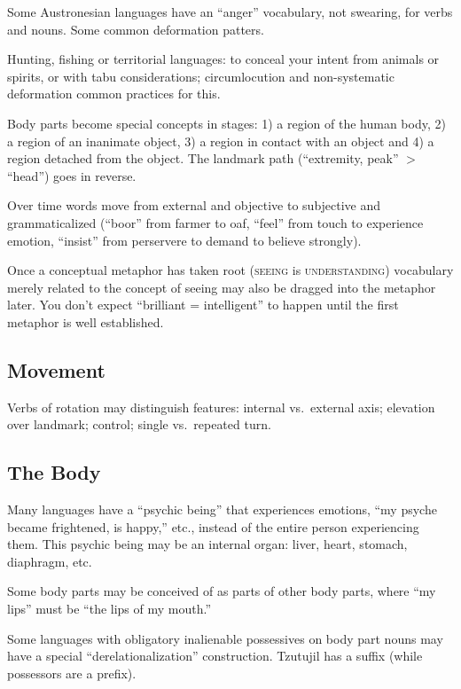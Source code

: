\documentclass[11pt]{article}
\newcommand{\I}[1]{\textsc{#1}}   %
\begin{document}
Some Austronesian languages have an ``anger'' vocabulary, not
swearing, for verbs and nouns.  Some common deformation patters.

Hunting, fishing or territorial languages: to conceal your intent from
animals or spirits, or with tabu considerations; circumlocution and
non-systematic deformation common practices for this.

Body parts become special concepts in stages: 1) a region of the human
body, 2) a region of an inanimate object, 3) a region in contact with
an object and 4) a region detached from the object.  The landmark path
(``extremity, peak'' $>$ ``head'') goes in reverse.

Over time words move from external and objective to subjective and
grammaticalized (``boor'' from farmer to oaf, ``feel'' from touch to
experience emotion, ``insist'' from perservere to demand to believe
strongly).

Once a conceptual metaphor has taken root (\I{seeing} is
\I{understanding}) vocabulary merely related to the concept of seeing
may also be dragged into the metaphor later.  You don't expect
``brilliant = intelligent'' to happen until the first metaphor is well
established.

\subsection{Movement}
Verbs of rotation may distinguish features: internal vs.\ external
axis; elevation over landmark; control; single vs.\ repeated turn.


\subsection{The Body}
Many languages have a ``psychic being'' that experiences emotions,
``my psyche became frightened, is happy,'' etc., instead of the entire
person experiencing them.  This psychic being may be an internal
organ: liver, heart, stomach, diaphragm, etc.

Some body parts may be conceived of as parts of other body parts,
where ``my lips'' must be ``the lips of my mouth.''

Some languages with obligatory inalienable possessives on body part
nouns may have a special ``derelationalization'' construction.
Tzutujil has a suffix (while possessors are a prefix).
\end{document}
